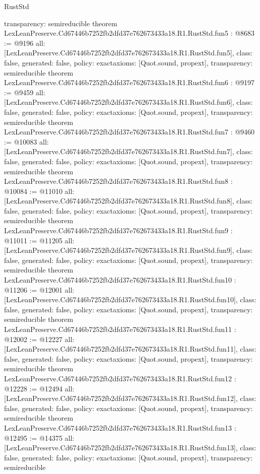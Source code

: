 \begin{lexlean}{RustStd}
\begin{coremodule}
{  transparency: semireducible
}
theorem LexLeanPreserve.Cd67446b7252fb2dfd37e762673433a18.R1.RustStd.fun5 : @8683 := @9196 {
  all: [LexLeanPreserve.Cd67446b7252fb2dfd37e762673433a18.R1.RustStd.fun5],
  class: false,
  generated: false,
  policy: exact{axioms: [Quot.sound, propext]},
  transparency: semireducible
}
theorem LexLeanPreserve.Cd67446b7252fb2dfd37e762673433a18.R1.RustStd.fun6 : @9197 := @9459 {
  all: [LexLeanPreserve.Cd67446b7252fb2dfd37e762673433a18.R1.RustStd.fun6],
  class: false,
  generated: false,
  policy: exact{axioms: [Quot.sound, propext]},
  transparency: semireducible
}
theorem LexLeanPreserve.Cd67446b7252fb2dfd37e762673433a18.R1.RustStd.fun7 : @9460 := @10083 {
  all: [LexLeanPreserve.Cd67446b7252fb2dfd37e762673433a18.R1.RustStd.fun7],
  class: false,
  generated: false,
  policy: exact{axioms: [Quot.sound, propext]},
  transparency: semireducible
}
theorem LexLeanPreserve.Cd67446b7252fb2dfd37e762673433a18.R1.RustStd.fun8 : @10084 := @11010 {
  all: [LexLeanPreserve.Cd67446b7252fb2dfd37e762673433a18.R1.RustStd.fun8],
  class: false,
  generated: false,
  policy: exact{axioms: [Quot.sound, propext]},
  transparency: semireducible
}
theorem LexLeanPreserve.Cd67446b7252fb2dfd37e762673433a18.R1.RustStd.fun9 : @11011 := @11205 {
  all: [LexLeanPreserve.Cd67446b7252fb2dfd37e762673433a18.R1.RustStd.fun9],
  class: false,
  generated: false,
  policy: exact{axioms: [Quot.sound, propext]},
  transparency: semireducible
}
theorem LexLeanPreserve.Cd67446b7252fb2dfd37e762673433a18.R1.RustStd.fun10 : @11206 := @12001 {
  all: [LexLeanPreserve.Cd67446b7252fb2dfd37e762673433a18.R1.RustStd.fun10],
  class: false,
  generated: false,
  policy: exact{axioms: [Quot.sound, propext]},
  transparency: semireducible
}
theorem LexLeanPreserve.Cd67446b7252fb2dfd37e762673433a18.R1.RustStd.fun11 : @12002 := @12227 {
  all: [LexLeanPreserve.Cd67446b7252fb2dfd37e762673433a18.R1.RustStd.fun11],
  class: false,
  generated: false,
  policy: exact{axioms: [Quot.sound, propext]},
  transparency: semireducible
}
theorem LexLeanPreserve.Cd67446b7252fb2dfd37e762673433a18.R1.RustStd.fun12 : @12228 := @12494 {
  all: [LexLeanPreserve.Cd67446b7252fb2dfd37e762673433a18.R1.RustStd.fun12],
  class: false,
  generated: false,
  policy: exact{axioms: [Quot.sound, propext]},
  transparency: semireducible
}
theorem LexLeanPreserve.Cd67446b7252fb2dfd37e762673433a18.R1.RustStd.fun13 : @12495 := @14375 {
  all: [LexLeanPreserve.Cd67446b7252fb2dfd37e762673433a18.R1.RustStd.fun13],
  class: false,
  generated: false,
  policy: exact{axioms: [Quot.sound, propext]},
  transparency: semireducible
}
\end{coremodule}
\end{lexlean}
